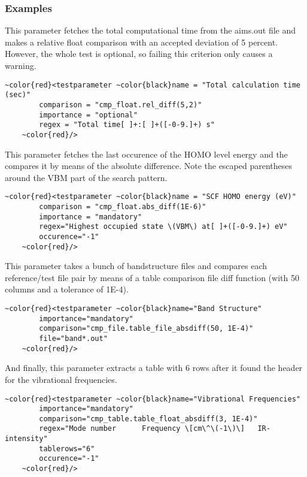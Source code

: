 \documentclass[a4paper,12pt]{scrartcl}
\begin{document}
\subsubsection*{Examples}
This parameter fetches the total computational time from the aims.out file and makes a relative float comparison with
an accepted deviation of 5 percent. However, the whole test is optional, so failing this criterion only causes a
warning.
\begin{Verbatim}[commandchars=~\{\},gobble=4, frame=single, framesep=2mm, label=definition of the total time
testparameter, labelposition=bottomline]
    ~color{red}<testparameter ~color{black}name = "Total calculation time (sec)"
        comparison = "cmp_float.rel_diff(5,2)"
        importance = "optional"
        regex = "Total time[ ]+:[ ]+([-0-9.]+) s"
    ~color{red}/>
\end{Verbatim}
This parameter fetches the last occurence of the HOMO level energy and the compares it by means of the absolute
difference. Note the escaped parentheses around the VBM part of the search pattern.
\begin{Verbatim}[commandchars=~\{\},gobble=4, frame=single, framesep=2mm, label=definition of the SCF HOMO energy
testparameter, labelposition=bottomline]
    ~color{red}<testparameter ~color{black}name = "SCF HOMO energy (eV)"
        comparison = "cmp_float.abs_diff(1E-6)"
        importance = "mandatory"
        regex="Highest occupied state \(VBM\) at[ ]+([-0-9.]+) eV"
        occurence="-1"
    ~color{red}/>
\end{Verbatim}
This parameter takes a bunch of bandstructure files and compares each reference/test file pair by means of a table
comparison file diff function (with 50 columns and a tolerance of 1E-4).
\begin{Verbatim}[commandchars=~\{\},gobble=4, frame=single, framesep=2mm, label=definition of the band structure
testparameter, labelposition=bottomline]
    ~color{red}<testparameter ~color{black}name="Band Structure"
        importance="mandatory"
        comparison="cmp_file.table_file_absdiff(50, 1E-4)"
        file="band*.out"
    ~color{red}/>
\end{Verbatim}
And finally, this parameter extracts a table with 6 rows after it found the header for the vibrational frequencies.
\begin{Verbatim}[commandchars=~\{\},gobble=4, frame=single, framesep=2mm, label=definition of the DFPT vibrational
frequencies testparameter, labelposition=bottomline]
    ~color{red}<testparameter ~color{black}name="Vibrational Frequencies"
        importance="mandatory"
        comparison="cmp_table.table_float_absdiff(3, 1E-4)"
        regex="Mode number      Frequency \[cm\^\(-1\)\]   IR-intensity"
        tablerows="6"
        occurence="-1"
    ~color{red}/>
\end{Verbatim}
\end{document}
